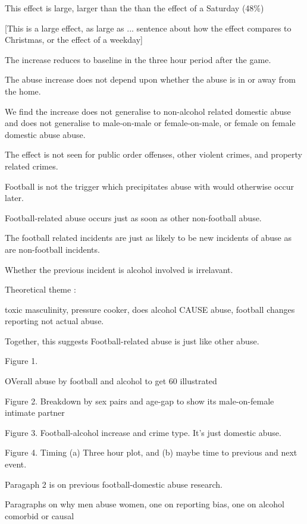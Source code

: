\documentclass[12pt, letterpaper]{article}
\begin{document}
This effect is large, larger than the  than the effect of a Saturday (48\%)

[This is a large effect, as large as ... sentence about how the effect compares to Christmas, or the effect of a weekday]

The increase reduces to baseline in the three hour period after the game.

The abuse increase does not depend upon whether the abuse is in or away from the home.

We find the increase does not generalise to non-alcohol related domestic abuse and does not generalise to male-on-male or female-on-male, or female on female domestic abuse abuse. 

The effect is not seen for public order offenses, other violent crimes, and property related crimes.  

Football is not the trigger which precipitates abuse with would otherwise occur later. 

Football-related abuse occurs just as soon as other non-football abuse. 

The football related incidents are just as likely to be new incidents of abuse as are non-football incidents. 


Whether the previous incident is alcohol involved is irrelavant.

Theoretical theme :

toxic masculinity, pressure cooker, does alcohol CAUSE abuse, football changes reporting not actual abuse.

Together, this suggests Football-related abuse is just like other abuse. 


Figure 1.

OVerall abuse by football and alcohol to get 60 illustrated

Figure 2. Breakdown by sex pairs and age-gap to show its male-on-female intimate partner

Figure 3. Football-alcohol increase and crime type. It's just domestic abuse.

Figure 4. Timing (a) Three hour plot, and (b) maybe time to previous and next event.

Paragaph 2 is on previous football-domestic abuse research.

Paragraphs on why men abuse women, one on reporting bias, one on alcohol comorbid or causal
\end{document}
